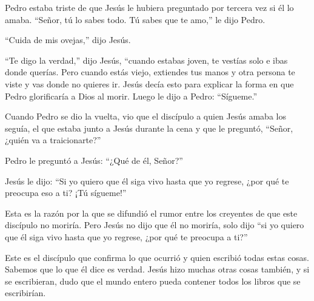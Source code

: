 Pedro estaba triste de que Jesús le hubiera preguntado por tercera vez
si él lo amaba. ``Señor, tú lo sabes todo. Tú sabes que te amo,'' le
dijo Pedro.

``Cuida de mis ovejas,'' dijo Jesús.

 ``Te digo la verdad,'' dijo Jesús, ``cuando estabas joven,
te vestías solo e ibas donde querías. Pero cuando estás viejo, extiendes
tus manos y otra persona te viste y vas donde no quieres ir.
 Jesús decía esto para explicar la forma en que Pedro
glorificaría a Dios al morir. Luego le dijo a Pedro: ``Sígueme.''

 Cuando Pedro se dio la vuelta, vio que el discípulo a
quien Jesús amaba los seguía, el que estaba junto a Jesús durante la
cena y que le preguntó, ``Señor, ¿quién va a traicionarte?''

 Pedro le preguntó a Jesús: ``¿Qué de él, Señor?''

 Jesús le dijo: ``Si yo quiero que él siga vivo hasta que
yo regrese, ¿por qué te preocupa eso a ti? ¡Tú sígueme!''

 Esta es la razón por la que se difundió el rumor entre los
creyentes de que este discípulo no moriría. Pero Jesús no dijo que él no
moriría, solo dijo ``si yo quiero que él siga vivo hasta que yo regrese,
¿por qué te preocupa a ti?''

 Este es el discípulo que confirma lo que ocurrió y quien
escribió todas estas cosas. Sabemos que lo que él dice es verdad.
 Jesús hizo muchas otras cosas también, y si se
escribieran, dudo que el mundo entero pueda contener todos los libros
que se escribirían.
